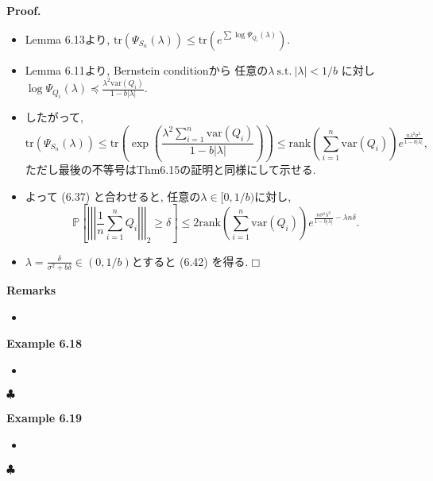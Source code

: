 \documentclass[unicode,aspectratio=169,11pt]{beamer}
\def\qed{\hfill $\Box$}
\def\endexample{\hfill $\clubsuit$}
\newcommand{\var}{\mathrm{var}}
\newcommand{\bb}{\mathbb}
\newcommand{\trace}{\mathrm{tr}}
\begin{document}
\begin{frame}{}{}
{\bf Proof.}
\begin{itemize}
  \item Lemma 6.13より, $\trace(\Psi_{S_n}(\lambda)) \le \trace(e^{\sum \log \Psi_{Q_i}(\lambda)})$.
  \item Lemma 6.11より, Bernstein conditionから 任意の$\lambda\ \mathrm{s.t.}\ |\lambda| < 1/b$ に対し $\log \Psi_{Q_i}(\lambda) \preceq \frac{\lambda^2 \var(Q_i)}{1 - b|\lambda|}$.
  \item したがって, 
        \[
          \trace\left(\Psi_{S_n}(\lambda)\right)
          \le \trace\left(\exp\left( \frac{\lambda^2 \sum_{i=1}^n \var(Q_i)}{1 - b|\lambda|} \right)\right)
          \le \mathrm{rank}\left(\sum_{i=1}^n \var(Q_i)\right)e^{\frac{n\lambda^2\sigma^2}{1 - b|\lambda|}},
        \]
        ただし最後の不等号はThm6.15の証明と同様にして示せる.
  \item よって (6.37) と合わせると, 任意の$\lambda \in [0, 1/b)$に対し, 
        \[
          \bb{P}\left[\left|\left|\left|\frac{1}{n}\sum_{i=1}^n Q_i \right|\right|\right|_2 \ge \delta\right]
          \le 2 \mathrm{rank}\left(\sum_{i=1}^n \var(Q_i)\right) e^{\frac{n\sigma^2 \lambda^2}{1 - b|\lambda|} - \lambda n \delta}.
        \]
  \item $\lambda  = \frac{\delta}{\sigma^2 + b\delta} \in (0, 1/b)$とすると (6.42) を得る.\qed
\end{itemize}
\end{frame}

\begin{frame}{}{}
  {\bf Remarks}
  \begin{itemize}
    \item 
  \end{itemize}
\end{frame}

\begin{frame}{}{}
  {\bf Example 6.18}
  \begin{itemize}
    \item 
  \end{itemize}
  \endexample
\end{frame}

\begin{frame}{}{}
  {\bf Example 6.19}
  \begin{itemize}
    \item 
  \end{itemize}
  \endexample
\end{frame}
\end{document}
